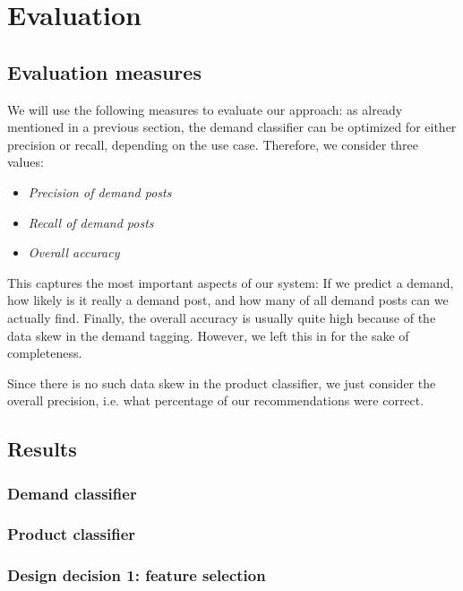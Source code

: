 
\section{Evaluation}
\label{sec:evaluation}


\subsection{Evaluation measures}
\label{sub:evaluation_measures}
We will use the following measures to evaluate our approach:
as already mentioned in a previous section, the demand classifier can be optimized for either precision or recall, depending on the use case.
Therefore, we consider three values:
\begin{itemize}
	\item
		\emph{Precision of demand posts} 
	\item
		\emph{Recall of demand posts} 
	\item
		\emph{Overall accuracy} 
\end{itemize}
This captures the most important aspects of our system: If we predict a demand, how likely is it really a demand post, and how many of all demand posts can we actually find.
Finally, the overall accuracy is usually quite high because of the data skew in the demand tagging.
However, we left this in for the sake of completeness.

Since there is no such data skew in the product classifier, we just consider the overall precision, i.e. what percentage of our recommendations were correct.


\subsection{Results}
\label{sub:results}

\subsubsection{Demand classifier}
\label{ssub:demand_classifier}


\subsubsection{Product classifier}
\label{ssub:product_classifier}


\subsubsection{Design decision 1: feature selection}

